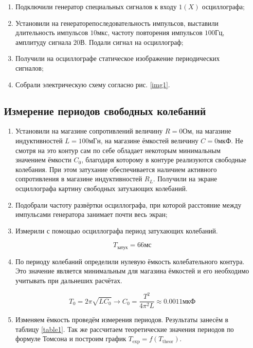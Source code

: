 \documentclass[a4paper,12pt]{article} %
\begin{document}
\begin{enumerate}
    \item Подключили генератор специальных сигналов к входу $1(X)$ осциллографа;
    \item Установили на генераторепоследовательность импульсов, выставили длительность импульсов $10 мкс$, частоту повторения импульсов $100 Гц$, амплитуду сигнала $20 В$. Подали сигнал на осциллограф;
    \item Получили на осциллографе статическое изображение периодических сигналов;
    \item Собрали электрическую схему согласно рис. \ref{img1}.
\end{enumerate}

\subsection{Измерение периодов свободных колебаний}

\begin{enumerate}
    \item Установили на магазине сопротивлений величину $R = 0 Ом$, на магазине индуктивностей $L = 100 мГн$, на магазине ёмкостей величину $C = 0 мкФ$. Не смотря на это контур сам по себе обладает некоторым минимальным значением ёмкости $C_0$, благодаря которому в контуре реализуются свободные колебания. При этом затухание обеспечивается наличием активного сопротивления в магазине индуктивностей $R_L$. Получили на экране осциллографа картину свободных затухающих колебаний.
    \item Подобрали частоту развёртки осциллографа, при которой расстояние между импульсами генератора занимает почти весь экран;
    \item Измерили с помощью осциллографа период затухающих колебаний. 
    
    \[ T_{\text{затух}} = 66 \text{мс} \]

    \item По периоду колебаний определили нулевую ёмкость колебательного контура. Это значение является минимальным для магазина ёмкостей и его необходимо учитывать при дальнеших расчётах.

    \[ T_0 = 2\pi \sqrt{LC_0} \longrightarrow C_0 = \frac{T^2}{4\pi^2L} \approx 0.0011 \text{мкФ} \]

    \item Изменяем ёмкость проведём измерения периодов. Результаты занесём в таблицу \ref{table1}. Так же рассчитаем теоретические значения периодов по формуле Томсона и построим график $T_{\text{exp}} = f(T_{\text{theor}})$.

    \end{enumerate}
\end{document}

